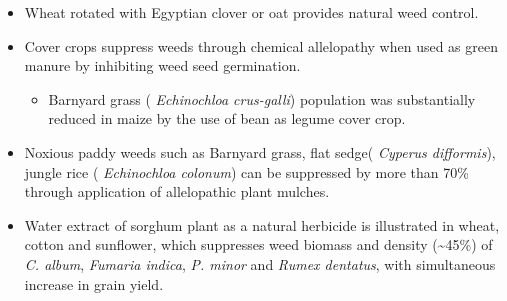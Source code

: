 \documentclass[11pt,dvipsnames,ignorenonframetext,aspectratio=169]{beamer}
\providecommand{\tightlist}{%
  \setlength{\itemsep}{0pt}\setlength{\parskip}{0pt}}
\begin{document}
\begin{frame}{}
\protect\hypertarget{section-10}{}
\small

\begin{itemize}
\tightlist
\item
  Wheat rotated with Egyptian clover or oat provides natural weed
  control.
\item
  Cover crops suppress weeds through chemical allelopathy when used as
  green manure by inhibiting weed seed germination.

  \begin{itemize}
  \tightlist
  \item
    Barnyard grass ( \emph{Echinochloa crus-galli}) population was
    substantially reduced in maize by the use of bean as legume cover
    crop.
  \end{itemize}
\item
  Noxious paddy weeds such as Barnyard grass, flat sedge( \emph{Cyperus
  difformis}), jungle rice ( \emph{Echinochloa colonum}) can be
  suppressed by more than 70\% through application of allelopathic plant
  mulches.
\item
  Water extract of sorghum plant as a natural herbicide is illustrated
  in wheat, cotton and sunflower, which suppresses weed biomass and
  density (\textasciitilde45\%) of \emph{C. album}, \emph{Fumaria
  indica}, \emph{P. minor} and \emph{Rumex dentatus}, with simultaneous
  increase in grain yield.
\end{itemize}
\end{frame}
\end{document}
